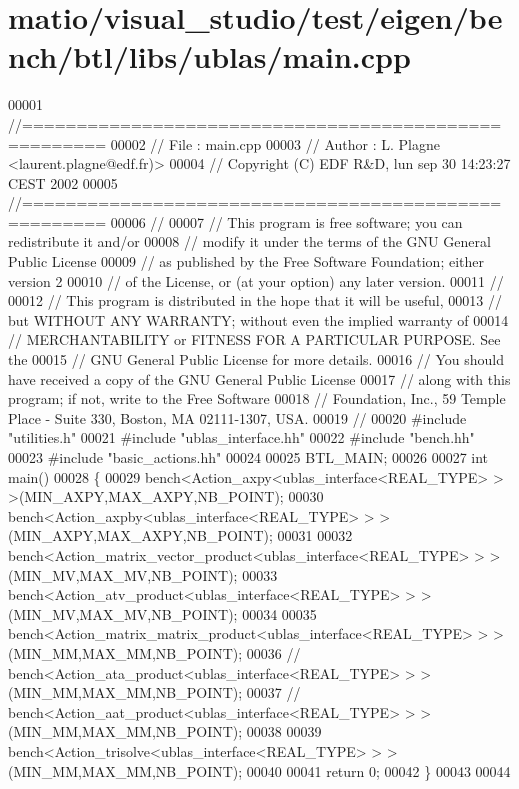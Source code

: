 \hypertarget{matio_2visual__studio_2test_2eigen_2bench_2btl_2libs_2ublas_2main_8cpp_source}{}\section{matio/visual\+\_\+studio/test/eigen/bench/btl/libs/ublas/main.cpp}
\label{matio_2visual__studio_2test_2eigen_2bench_2btl_2libs_2ublas_2main_8cpp_source}

\begin{DoxyCode}
00001 \textcolor{comment}{//=====================================================}
00002 \textcolor{comment}{// File   :  main.cpp}
00003 \textcolor{comment}{// Author :  L. Plagne <laurent.plagne@edf.fr)>}
00004 \textcolor{comment}{// Copyright (C) EDF R&D,  lun sep 30 14:23:27 CEST 2002}
00005 \textcolor{comment}{//=====================================================}
00006 \textcolor{comment}{//}
00007 \textcolor{comment}{// This program is free software; you can redistribute it and/or}
00008 \textcolor{comment}{// modify it under the terms of the GNU General Public License}
00009 \textcolor{comment}{// as published by the Free Software Foundation; either version 2}
00010 \textcolor{comment}{// of the License, or (at your option) any later version.}
00011 \textcolor{comment}{//}
00012 \textcolor{comment}{// This program is distributed in the hope that it will be useful,}
00013 \textcolor{comment}{// but WITHOUT ANY WARRANTY; without even the implied warranty of}
00014 \textcolor{comment}{// MERCHANTABILITY or FITNESS FOR A PARTICULAR PURPOSE.  See the}
00015 \textcolor{comment}{// GNU General Public License for more details.}
00016 \textcolor{comment}{// You should have received a copy of the GNU General Public License}
00017 \textcolor{comment}{// along with this program; if not, write to the Free Software}
00018 \textcolor{comment}{// Foundation, Inc., 59 Temple Place - Suite 330, Boston, MA  02111-1307, USA.}
00019 \textcolor{comment}{//}
00020 \textcolor{preprocessor}{#include "utilities.h"}
00021 \textcolor{preprocessor}{#include "ublas\_interface.hh"}
00022 \textcolor{preprocessor}{#include "bench.hh"}
00023 \textcolor{preprocessor}{#include "basic\_actions.hh"}
00024 
00025 BTL\_MAIN;
00026 
00027 \textcolor{keywordtype}{int} main()
00028 \{
00029   bench<Action\_axpy<ublas\_interface<REAL\_TYPE> > >(MIN\_AXPY,MAX\_AXPY,NB\_POINT);
00030   bench<Action\_axpby<ublas\_interface<REAL\_TYPE> > >(MIN\_AXPY,MAX\_AXPY,NB\_POINT);
00031 
00032   bench<Action\_matrix\_vector\_product<ublas\_interface<REAL\_TYPE> > >(MIN\_MV,MAX\_MV,NB\_POINT);
00033   bench<Action\_atv\_product<ublas\_interface<REAL\_TYPE> > >(MIN\_MV,MAX\_MV,NB\_POINT);
00034 
00035   bench<Action\_matrix\_matrix\_product<ublas\_interface<REAL\_TYPE> > >(MIN\_MM,MAX\_MM,NB\_POINT);
00036 \textcolor{comment}{//   bench<Action\_ata\_product<ublas\_interface<REAL\_TYPE> > >(MIN\_MM,MAX\_MM,NB\_POINT);}
00037 \textcolor{comment}{//   bench<Action\_aat\_product<ublas\_interface<REAL\_TYPE> > >(MIN\_MM,MAX\_MM,NB\_POINT);}
00038 
00039   bench<Action\_trisolve<ublas\_interface<REAL\_TYPE> > >(MIN\_MM,MAX\_MM,NB\_POINT);
00040 
00041   \textcolor{keywordflow}{return} 0;
00042 \}
00043 
00044 
\end{DoxyCode}
